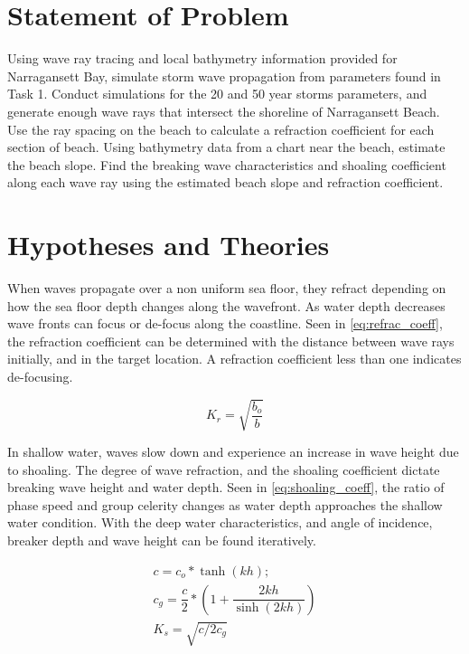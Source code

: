 \section{Statement of Problem}

Using wave ray tracing and local bathymetry information provided for Narragansett Bay, simulate storm wave propagation from parameters found in Task 1. Conduct simulations for the 20 and 50 year storms parameters, and generate enough wave rays that intersect the shoreline of Narragansett Beach. Use the ray spacing on the beach to calculate a refraction coefficient for each section of beach. Using bathymetry data from a chart near the beach, estimate the beach slope. Find the breaking wave characteristics and shoaling coefficient along each wave ray using the estimated beach slope and refraction coefficient.

\section{Hypotheses and Theories}

When waves propagate over a non uniform sea floor, they refract depending on how the sea floor depth changes along the wavefront. As water depth decreases wave fronts can focus or de-focus along the coastline. Seen in \ref{eq:refrac_coeff}, the refraction coefficient can be determined with the distance between wave rays initially, and in the target location. A refraction coefficient less than one indicates de-focusing.

\begin{equation}
K_{r} = \sqrt{\dfrac{b_{o}}{b}}
\label{eq:refrac_coeff}
\end{equation}

In shallow water, waves slow down and experience an increase in wave height due to shoaling. The degree of wave refraction, and the shoaling coefficient dictate breaking wave height and water depth. Seen in \ref{eq:shoaling_coeff}, the ratio of phase speed and group celerity changes as water depth approaches the shallow water condition. With the deep water characteristics, and angle of incidence, breaker depth and wave height can be found iteratively.

\begin{align}[H]
c = c_{o} * \tanh(kh); \\
c_{g} = \dfrac{c}{2} * \left(1 + \dfrac{2kh}{\sinh(2kh)}\right) \\
K_{s} = \sqrt{c/2c_{g}}
\label{eq:shoaling_coeff}
\end{align}

